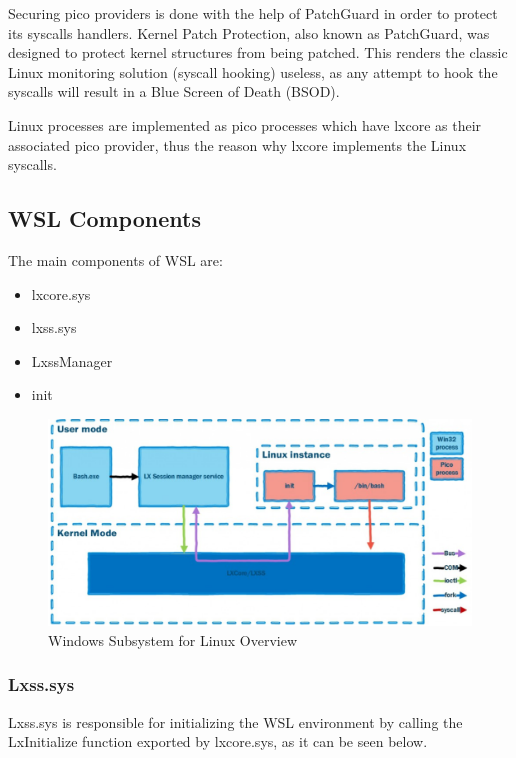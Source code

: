             Securing pico providers is done with the help of PatchGuard in order to protect its syscalls handlers. Kernel Patch Protection,
            also known as PatchGuard, was designed to protect kernel structures from being patched. This renders the classic Linux
            monitoring solution (syscall hooking) useless, as any attempt to hook the syscalls will result in a Blue Screen of Death (BSOD).


        Linux processes are implemented as pico processes which have lxcore as their associated pico provider, thus the reason why lxcore
        implements the Linux syscalls.


        \subsection{WSL Components}
            The main components of WSL are:
            \begin{itemize}
                \item lxcore.sys
                \item lxss.sys
                \item LxssManager
                \item init
            \end{itemize}

            \begin{figure}[H]
                \includegraphics[width=\linewidth]{img/wsl_components.png}
                \caption{Windows Subsystem for Linux Overview \protect\cite{WSLComponents}}
                \label{fig:wsl_components}
            \end{figure}

            \subsubsection{Lxss.sys}
            Lxss.sys is responsible for initializing the WSL environment by calling the LxInitialize function exported by lxcore.sys, as it can be
            seen below.

